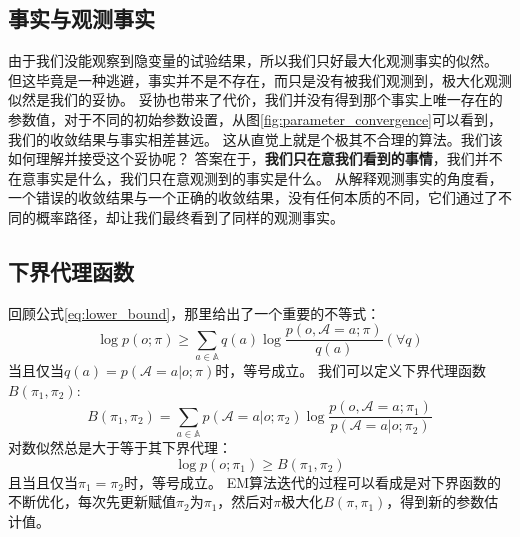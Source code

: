 \documentclass[12pt,a4paper]{article}
\begin{document}
\subsection{事实与观测事实}
由于我们没能观察到隐变量的试验结果，所以我们只好最大化观测事实的似然。
但这毕竟是一种逃避，事实并不是不存在，而只是没有被我们观测到，极大化观测似然是我们的妥协。
妥协也带来了代价，我们并没有得到那个事实上唯一存在的参数值，对于不同的初始参数设置，从图\ref{fig:parameter_convergence}可以看到，我们的收敛结果与事实相差甚远。
这从直觉上就是个极其不合理的算法。我们该如何理解并接受这个妥协呢？
答案在于，\textbf{我们只在意我们看到的事情}，我们并不在意事实是什么，我们只在意观测到的事实是什么。
从解释观测事实的角度看，一个错误的收敛结果与一个正确的收敛结果，没有任何本质的不同，它们通过了不同的概率路径，却让我们最终看到了同样的观测事实。

\subsection{下界代理函数}
回顾公式\ref{eq:lower_bound}，那里给出了一个重要的不等式：
\begin{equation}
    \log p(o;\pi)\geq \sum_{a \in \mathbb{A}}q(a)\log \frac{p(o,\mathcal{A}=a;\pi)}{q(a)} (\forall q)
\end{equation}
当且仅当$q(a)=p(\mathcal{A}=a|o;\pi)$时，等号成立。
我们可以定义下界代理函数$B(\pi_1,\pi_2)$:
\begin{equation}
    B(\pi_1,\pi_2)=\sum_{a \in \mathbb{A}}p(\mathcal{A}=a|o;\pi_2)\log \frac{p(o,\mathcal{A}=a;\pi_1)}{p(\mathcal{A}=a|o;\pi_2)}
\end{equation}
对数似然总是大于等于其下界代理：
\begin{equation}
    \log p(o;\pi_1)\geq B(\pi_1,\pi_2)
\end{equation}
且当且仅当$\pi_1=\pi_2$时，等号成立。
EM算法迭代的过程可以看成是对下界函数的不断优化，每次先更新赋值$\pi_2$为$\pi_1$，然后对$\pi$极大化$B(\pi,\pi_1)$，得到新的参数估计值。
\end{document}
